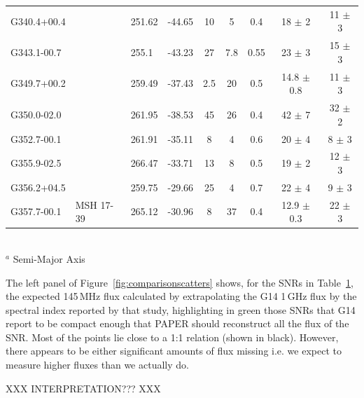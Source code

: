 \documentclass[useAMS,usenatbib]{mn2e}
\begin{document}
\begin{table}
\begin{tabular}{llllccccc}
G340.4+00.4	&		&	251.62	&	-44.65	&	10	&	5	&	0.4	&	18	$\pm$	2	&	11	$\pm$	3	\\
G343.1-00.7	&		&	255.1	&	-43.23	&	27	&	7.8	&	0.55	&	23	$\pm$	3	&	15	$\pm$	3	\\
G349.7+00.2	&		&	259.49	&	-37.43	&	2.5	&	20	&	0.5	&	14.8	$\pm$	0.8	&	11	$\pm$	3	\\
G350.0-02.0	&		&	261.95	&	-38.53	&	45	&	26	&	0.4	&	42	$\pm$	7	&	32	$\pm$	2	\\
G352.7-00.1	&		&	261.91	&	-35.11	&	8	&	4	&	0.6	&	20	$\pm$	4	&	8	$\pm$	3	\\
G355.9-02.5	&		&	266.47	&	-33.71	&	13	&	8	&	0.5	&	19	$\pm$	2	&	12	$\pm$	3	\\
G356.2+04.5	&		&	259.75	&	-29.66	&	25	&	4	&	0.7	&	22	$\pm$	4	&	9	$\pm$	3	\\
G357.7-00.1	&	MSH 17-39	&	265.12	&	-30.96	&	8	&	37	&	0.4	&	12.9	$\pm$	0.3	&	22	$\pm$	3	\\
\hline
\end{tabular}
\\
$^a$ Semi-Major Axis
\label{tab:G14comparison}
\end{table}

The left panel of Figure~\ref{fig:comparisonscatters} shows, for the SNRs in Table~\ref{tab:G14comparison}, the expected 145\,MHz flux calculated by extrapolating the G14 1\,GHz flux by the spectral index reported by that study, highlighting in green those SNRs that G14 report to be compact enough that PAPER should reconstruct all the flux of the SNR. Most of the points lie close to a 1:1 relation (shown in black). However, there appears to be either significant amounts of flux missing i.e. we expect to measure higher fluxes than we actually do. 

XXX INTERPRETATION??? XXX
\end{document}
